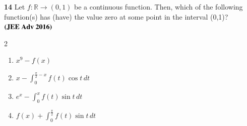 \documentclass[journal,12pt,twocolumn]{IEEEtran}
\theoremstyle{remark}
\begin{document}
					     \textbf{14} Let $f: \mathbb{R} \to (0,1)$ be a continuous function. Then, which of the following function(s) has (have) the value zero at some point in the interval (0,1)?  $\hfill \textbf{(JEE Adv 2016)}$
					     \begin{multicols}{2}
					     \begin{enumerate}
					         \item[(a)] $x^9 - f(x)$
						     \item[(b)] $x - \int_{0}^{\frac{\pi}{2} - x} f(t) \cos t \, dt$
						         \item[(c)] $e^x - \int_{0}^{x} f(t) \sin t \, dt$
							     \item[(d)] $f(x) + \int_{0}^{\frac{\pi}{2}} f(t) \sin t \, dt$
							     \end{enumerate}
							     \end{multicols}
\end{document}
